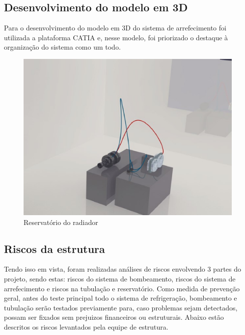 \subsection{Desenvolvimento do modelo em 3D}

Para o desenvolvimento do modelo em 3D do sistema de arrefecimento foi utilizada a plataforma CATIA e, nesse modelo, foi priorizado o destaque à organização do sistema como um todo.

\begin{figure}[!htb]                                                               
   \centering                                                                      
   \includegraphics[scale=0.6, keepaspectratio=true]{figuras/visualizacao3d.eps} 
   \caption{Reservatório do radiador}
\end{figure}

\subsection{Riscos da estrutura}

Tendo  isso em vista, foram realizadas análises de riscos envolvendo 3 partes do projeto, sendo estas: riscos do sistema de bombeamento, riscos do sistema de arrefecimento e riscos na tubulação e reservatório.
Como medida de prevenção geral, antes do teste principal todo o sistema de refrigeração, bombeamento e tubulação serão testados previamente para, caso problemas sejam detectados, possam ser fixados sem prejuizos financeiros ou estruturais. Abaixo estão descritos os riscos levantados pela equipe de estrutura.

